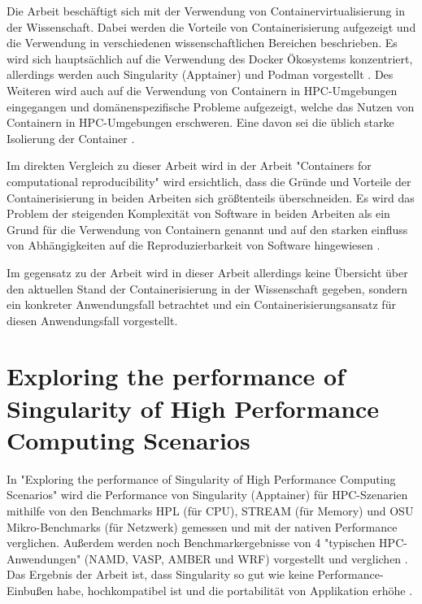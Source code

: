 Die Arbeit beschäftigt sich mit der Verwendung von Containervirtualisierung in der Wissenschaft. Dabei werden die Vorteile von Containerisierung aufgezeigt \cite[Vgl. S. 4ff]{moreauContainersComputationalReproducibility2023} und die Verwendung in verschiedenen wissenschaftlichen Bereichen \cite[Vgl. S. 6ff]{moreauContainersComputationalReproducibility2023} beschrieben. Es wird sich hauptsächlich auf die Verwendung des Docker Ökosystems konzentriert, allerdings werden auch Singularity (Apptainer) und Podman vorgestellt \cite[Vgl. S. 7]{moreauContainersComputationalReproducibility2023}. Des Weiteren wird auch auf die Verwendung von Containern in HPC-Umgebungen eingegangen und domänenspezifische Probleme aufgezeigt, welche das Nutzen von Containern in HPC-Umgebungen erschweren. Eine davon sei die üblich starke Isolierung der Container \cite[Vgl. S. 12f]{moreauContainersComputationalReproducibility2023}.

Im direkten Vergleich zu dieser Arbeit wird in der Arbeit "Containers for computational reproducibility" \cite{moreauContainersComputationalReproducibility2023} wird ersichtlich, dass die Gründe und Vorteile der Containerisierung in beiden Arbeiten sich größtenteils überschneiden. Es wird das Problem der steigenden Komplexität von Software in beiden Arbeiten als ein Grund für die Verwendung von Containern genannt \cite[Vgl. S. 1]{moreauContainersComputationalReproducibility2023} und auf den starken einfluss von Abhängigkeiten auf die Reproduzierbarkeit von Software hingewiesen \cite[Vgl. S. 2]{moreauContainersComputationalReproducibility2023}. 

Im gegensatz zu der Arbeit wird in dieser Arbeit allerdings keine Übersicht über den aktuellen Stand der Containerisierung in der Wissenschaft gegeben, sondern ein konkreter Anwendungsfall betrachtet und ein Containerisierungsansatz für diesen Anwendungsfall vorgestellt.



\section{Exploring the performance of Singularity of High Performance Computing Scenarios \cite{huExploringPerformanceSingularity2019}}

In "Exploring the performance of Singularity of High Performance Computing Scenarios" wird die Performance von Singularity (Apptainer) für HPC-Szenarien mithilfe von den Benchmarks HPL (für CPU), STREAM (für Memory) und OSU Mikro-Benchmarks (für Netzwerk) gemessen und mit der nativen Performance verglichen. Außerdem werden noch Benchmarkergebnisse von 4 "typischen HPC-Anwendungen" (NAMD, VASP, AMBER und WRF) vorgestellt und verglichen \cite[Vgl. S. 2587]{huExploringPerformanceSingularity2019}. Das Ergebnis der Arbeit ist, dass Singularity so gut wie keine Performance-Einbußen habe, hochkompatibel ist und die portabilität von Applikation erhöhe \cite[Vgl. S. 2592]{huExploringPerformanceSingularity2019}.  

